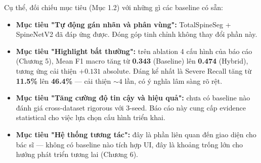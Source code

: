 Cụ thể, đối chiếu mục tiêu (Mục 1.2) với những gì các baseline có sẵn:
\begin{itemize}
    \item \textbf{Mục tiêu "Tự động gán nhãn và phân vùng":} TotalSpineSeg + SpineNetV2 đã đáp ứng được. Đóng góp tinh chỉnh không thay đổi phần này.
    \item \textbf{Mục tiêu "Highlight bất thường":} trên ablation 4 cấu hình của báo cáo (Chương 5), Mean F1 macro tăng từ \textbf{0.343} (Baseline) lên \textbf{0.474} (Hybrid), tương ứng cải thiện $+0.131$ absolute. Đáng kể nhất là Severe Recall tăng từ \textbf{11.5\%} lên \textbf{46.4\%} --- cải thiện $\sim 4$ lần, có ý nghĩa lâm sàng rõ rệt.
    \item \textbf{Mục tiêu "Tăng cường độ tin cậy và hiệu quả":} chưa có baseline nào đánh giá cross-dataset rigorous với 3-seed. Báo cáo này cung cấp evidence statistical cho việc lựa chọn cấu hình triển khai.
    \item \textbf{Mục tiêu "Hệ thống tương tác":} đây là phần liên quan đến giao diện cho bác sĩ --- không có baseline nào tích hợp UI, đây là khoảng trống lớn cho hướng phát triển tương lai (Chương 6).
\end{itemize}